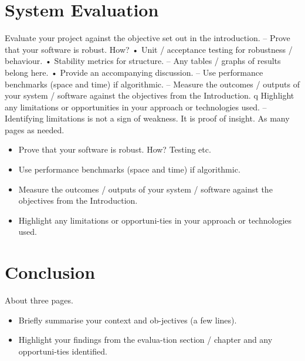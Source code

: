 \chapter{System Evaluation}
Evaluate your project against the objective set out in the
introduction.
– Prove that your software is robust. How?
• Unit / acceptance testing for robustness / behaviour.
• Stability metrics for structure.
– Any tables / graphs of results belong here.
• Provide an accompanying discussion.
– Use performance benchmarks (space and time) if algorithmic.
– Measure the outcomes / outputs of your system / software against
the objectives from the Introduction.
q Highlight any limitations or opportunities in your approach or
technologies used.
– Identifying limitations is not a sign of weakness. It is proof of
insight.
As many pages as needed.
\begin{itemize}
\item Prove that your software is robust. How? Testing etc. 
\item Use performance benchmarks (space and time) if algorithmic.
\item Measure the outcomes / outputs of your system / software against the objectives from the Introduction.
\item Highlight any limitations or opportuni-ties in your approach or technologies used.
\end{itemize}

\chapter{Conclusion}
About three pages.

\begin{itemize}
Briefly summarise your context and objectives.
– Remind the reader about the overall rationale and goals of the
project.
q Highlight your findings from the System Evaluation chapter.
– List out the outcomes of the project in a bulleted list.
– Serendipity – did you gain any tangential or even unrelated insights
by happenchance during the project?
• Lots of discoveries have been made this way, e.g. Flemming
and antibiotics.
– State any opportunities identified for future investigation.
q Finish on an upbeat note.
\item Briefly summarise your context and ob-jectives (a few lines).
\item Highlight your findings from the evalua-tion section / chapter and any opportuni-ties identified.
\end{itemize}
